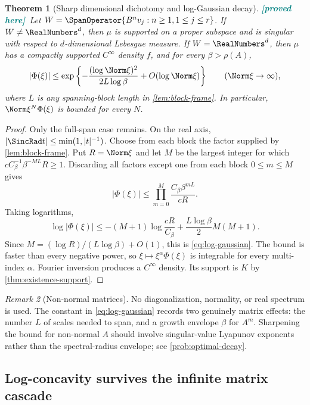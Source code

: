 \documentclass[11pt,oneside]{article}
\newtheorem{theorem}{Theorem}[section]
\theoremstyle{definition}
\theoremstyle{remark}
\newtheorem{remark}[theorem]{Remark}
\newcommand{\New}{\textcolor{teal}{\textbf{[proved here]}}}
\begin{document}
\begin{theorem}[Sharp dimensional dichotomy and log-Gaussian decay]
\label{thm:smoothness}
\New\ Let
$W=\SpanOperator\{B^nv_j:n\ge1,1\le j\le r\}$.  If $W\ne\RealNumbers^d$, then $\mu$ is
supported on a proper subspace and is singular with respect to $d$-dimensional
Lebesgue measure.  If $W=\RealNumbers^d$, then $\mu$ has a compactly supported
$C^\infty$ density $f$, and for every $\beta>\rho(A)$,
\begin{equation}
 |\Phi(\xi)|\le
 \exp\left
 \{-\frac{(\log\Norm\xi)^2}{2L\log\beta}+O(\log\Norm\xi)\right\}
 \qquad(\Norm\xi\to\infty),
 \label{eq:log-gaussian}
\end{equation}
where $L$ is any spanning-block length in \cref{lem:block-frame}.  In
particular, $\Norm\xi^N\Phi(\xi)$ is bounded for every $N$.
\end{theorem}

\begin{proof}
Only the full-span case remains.  On the real axis,
$|\SincRad t|\le\min(1,|t|^{-1})$.  Choose from each block the factor supplied by
\cref{lem:block-frame}.  Put $R=\Norm\xi$ and let $M$ be the largest integer for
which $cC_\beta^{-1}\beta^{-ML}R\ge1$.  Discarding all factors except one from
each block $0\le m\le M$ gives
\[
 |\Phi(\xi)|
 \le\prod_{m=0}^{M}\frac{C_\beta\beta^{mL}}{cR}.
\]
Taking logarithms,
\[
 \log|\Phi(\xi)|
 \le-(M+1)\log\frac{cR}{C_\beta}
     +\frac{L\log\beta}{2}M(M+1).
\]
Since $M=(\log R)/(L\log\beta)+O(1)$, this is
\eqref{eq:log-gaussian}.  The bound is faster than every negative power, so
$\xi\mapsto\xi^\alpha\Phi(\xi)$ is integrable for every multi-index $\alpha$.
Fourier inversion produces a $C^\infty$ density.  Its support is $K$ by
\cref{thm:existence-support}.
\end{proof}

\begin{remark}[Non-normal matrices]
No diagonalization, normality, or real spectrum is used.  The constant in
\eqref{eq:log-gaussian} records two genuinely matrix effects: the number $L$ of
scales needed to span, and a growth envelope $\beta$ for $A^m$.  Sharpening the
bound for non-normal $A$ should involve singular-value Lyapunov exponents rather
than the spectral-radius envelope; see \cref{prob:optimal-decay}.
\end{remark}

\subsection{Log-concavity survives the infinite matrix cascade}
\end{document}
